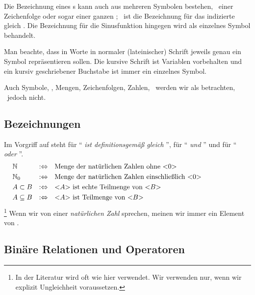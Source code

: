 Die Bezeichnung eines s kann auch aus mehreren Symbolen bestehen, \textdh\ einer Zeichenfolge oder sogar einer ganzen ; \textzB\ ist die Bezeichnung für das indizierte   gleich .
Die Bezeichnung für die Sinusfunktion hingegen wird als einzelnes Symbol behandelt.

Man beachte, dass in  Worte in normaler (lateinischer) Schrift jeweils genau ein Symbol repräsentieren sollen.
Die kursive Schrift ist Variablen vorbehalten und ein kursiv geschriebener Buchstabe ist immer ein einzelnes Symbol.

Auch Symbole, , Mengen, Zeichenfolgen, Zahlen, \textusw\ werden wir als  betrachten,  \textiAlg\ jedoch nicht.

\subsection{Bezeichnungen}%
\label{sub:Bezeichnungen}

Im Vorgriff auf  steht  für \enquote{ \emph{ist definitionsgemäß gleich} },  für \enquote{ \emph{und} } und  für \enquote{ \emph{oder} }.
\begin{align}
	& \mathbb{N}          & :\Leftrightarrow & \quad
	\text{Menge der natürlichen Zahlen ohne           <$0$>} \\
	& \mathbb{N}_0         & :\Leftrightarrow & \quad
	\text{Menge der natürlichen Zahlen einschließlich <$0$>} \\
	& A \subset B   & :\Leftrightarrow & \quad
	\text{<$A$> ist echte Teilmenge von <$B$>} \\
	& A \subseteq B & :\Leftrightarrow & \quad
	\text{<$A$> ist       Teilmenge von <$B$>} &&&&&&&&&&
\end{align}\footnote{%
	In der Literatur wird \symqt{\subset} oft wie hier \symqt{\subseteq} verwendet.
	Wir verwenden \symqt{\subset} nur, wenn wir explizit Ungleichheit voraussetzen.%
}
Wenn wir von einer \emph{natürlichen Zahl} sprechen, meinen wir immer ein Element von \objqt{\gsNo}.

\subsection{Binäre Relationen und Operatoren}%
\label{sub:binär}

